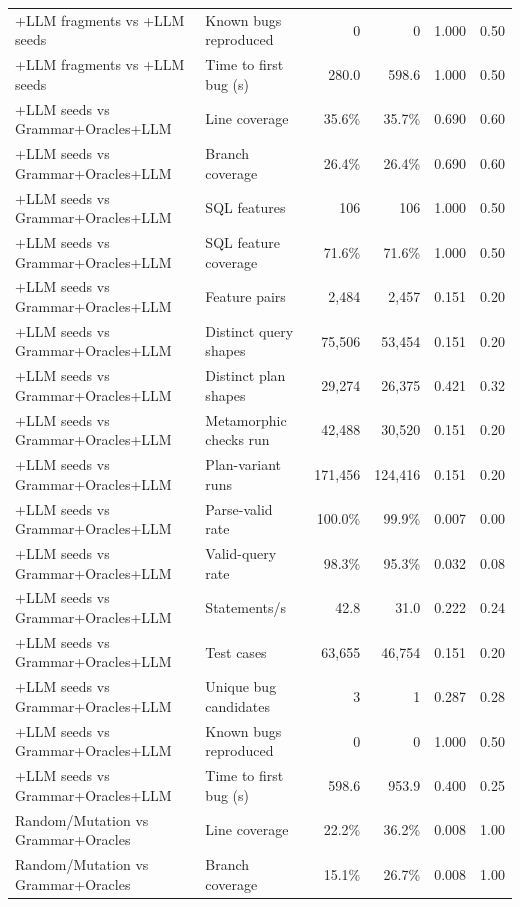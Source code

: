 \begin{table}[t]
\begin{tabular}{llrrrr}
    +LLM fragments vs +LLM seeds & Known bugs reproduced & 0 & 0 & 1.000 & 0.50 \\
    +LLM fragments vs +LLM seeds & Time to first bug (s) & 280.0 & 598.6 & 1.000 & 0.50 \\
    +LLM seeds vs Grammar+Oracles+LLM & Line coverage & 35.6\% & 35.7\% & 0.690 & 0.60 \\
    +LLM seeds vs Grammar+Oracles+LLM & Branch coverage & 26.4\% & 26.4\% & 0.690 & 0.60 \\
    +LLM seeds vs Grammar+Oracles+LLM & SQL features & 106 & 106 & 1.000 & 0.50 \\
    +LLM seeds vs Grammar+Oracles+LLM & SQL feature coverage & 71.6\% & 71.6\% & 1.000 & 0.50 \\
    +LLM seeds vs Grammar+Oracles+LLM & Feature pairs & 2{,}484 & 2{,}457 & 0.151 & 0.20 \\
    +LLM seeds vs Grammar+Oracles+LLM & Distinct query shapes & 75{,}506 & 53{,}454 & 0.151 & 0.20 \\
    +LLM seeds vs Grammar+Oracles+LLM & Distinct plan shapes & 29{,}274 & 26{,}375 & 0.421 & 0.32 \\
    +LLM seeds vs Grammar+Oracles+LLM & Metamorphic checks run & 42{,}488 & 30{,}520 & 0.151 & 0.20 \\
    +LLM seeds vs Grammar+Oracles+LLM & Plan-variant runs & 171{,}456 & 124{,}416 & 0.151 & 0.20 \\
    +LLM seeds vs Grammar+Oracles+LLM & Parse-valid rate & 100.0\% & 99.9\% & 0.007 & 0.00 \\
    +LLM seeds vs Grammar+Oracles+LLM & Valid-query rate & 98.3\% & 95.3\% & 0.032 & 0.08 \\
    +LLM seeds vs Grammar+Oracles+LLM & Statements/s & 42.8 & 31.0 & 0.222 & 0.24 \\
    +LLM seeds vs Grammar+Oracles+LLM & Test cases & 63{,}655 & 46{,}754 & 0.151 & 0.20 \\
    +LLM seeds vs Grammar+Oracles+LLM & Unique bug candidates & 3 & 1 & 0.287 & 0.28 \\
    +LLM seeds vs Grammar+Oracles+LLM & Known bugs reproduced & 0 & 0 & 1.000 & 0.50 \\
    +LLM seeds vs Grammar+Oracles+LLM & Time to first bug (s) & 598.6 & 953.9 & 0.400 & 0.25 \\
    Random/Mutation vs Grammar+Oracles & Line coverage & 22.2\% & 36.2\% & 0.008 & 1.00 \\
    Random/Mutation vs Grammar+Oracles & Branch coverage & 15.1\% & 26.7\% & 0.008 & 1.00 \\

\end{tabular}
\end{table}
